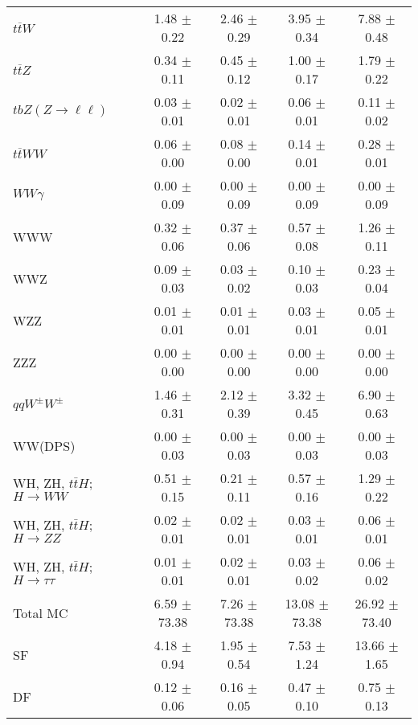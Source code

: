 \begin{tabular}{l|cccc}
                   $t\overline{t}W$ &  1.48 $\pm$  0.22 &  2.46 $\pm$  0.29 &  3.95 $\pm$  0.34 &  7.88 $\pm$  0.48 \\
                   $t\overline{t}Z$ &  0.34 $\pm$  0.11 &  0.45 $\pm$  0.12 &  1.00 $\pm$  0.17 &  1.79 $\pm$  0.22 \\
    $tbZ (Z \rightarrow \ell \ell)$ &  0.03 $\pm$  0.01 &  0.02 $\pm$  0.01 &  0.06 $\pm$  0.01 &  0.11 $\pm$  0.02 \\
                  $t\overline{t}WW$ &  0.06 $\pm$  0.00 &  0.08 $\pm$  0.00 &  0.14 $\pm$  0.01 &  0.28 $\pm$  0.01 \\
                         $WW\gamma$ &  0.00 $\pm$  0.09 &  0.00 $\pm$  0.09 &  0.00 $\pm$  0.09 &  0.00 $\pm$  0.09 \\
                                WWW &  0.32 $\pm$  0.06 &  0.37 $\pm$  0.06 &  0.57 $\pm$  0.08 &  1.26 $\pm$  0.11 \\
                                WWZ &  0.09 $\pm$  0.03 &  0.03 $\pm$  0.02 &  0.10 $\pm$  0.03 &  0.23 $\pm$  0.04 \\
                                WZZ &  0.01 $\pm$  0.01 &  0.01 $\pm$  0.01 &  0.03 $\pm$  0.01 &  0.05 $\pm$  0.01 \\
                                ZZZ &  0.00 $\pm$  0.00 &  0.00 $\pm$  0.00 &  0.00 $\pm$  0.00 &  0.00 $\pm$  0.00 \\
                 $qqW^{\pm}W^{\pm}$ &  1.46 $\pm$  0.31 &  2.12 $\pm$  0.39 &  3.32 $\pm$  0.45 &  6.90 $\pm$  0.63 \\
                            WW(DPS) &  0.00 $\pm$  0.03 &  0.00 $\pm$  0.03 &  0.00 $\pm$  0.03 &  0.00 $\pm$  0.03 \\
WH, ZH, $t\bar{t}H$; $H \rightarrow WW$ &  0.51 $\pm$  0.15 &  0.21 $\pm$  0.11 &  0.57 $\pm$  0.16 &  1.29 $\pm$  0.22 \\
WH, ZH, $t\bar{t}H$; $H \rightarrow ZZ$ &  0.02 $\pm$  0.01 &  0.02 $\pm$  0.01 &  0.03 $\pm$  0.01 &  0.06 $\pm$  0.01 \\
WH, ZH, $t\bar{t}H$; $H \rightarrow \tau\tau$ &  0.01 $\pm$  0.01 &  0.02 $\pm$  0.01 &  0.03 $\pm$  0.02 &  0.06 $\pm$  0.02 \\
\hline\hline
                           Total MC &  6.59 $\pm$ 73.38 &  7.26 $\pm$ 73.38 & 13.08 $\pm$ 73.38 & 26.92 $\pm$ 73.40 \\
\hline
                                 SF &  4.18 $\pm$  0.94 &  1.95 $\pm$  0.54 &  7.53 $\pm$  1.24 & 13.66 $\pm$  1.65 \\
                                 DF &  0.12 $\pm$  0.06 &  0.16 $\pm$  0.05 &  0.47 $\pm$  0.10 &  0.75 $\pm$  0.13 \\

\end{tabular}
